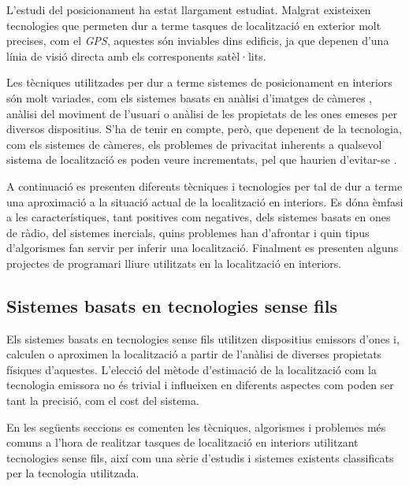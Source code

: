 
L’estudi del posicionament ha estat llargament estudiat. Malgrat existeixen tecnologies que permeten dur a terme tasques de localització en exterior molt precises, com el \textit{GPS}, aquestes són inviables dins edificis, ja que depenen d’una línia de visió directa amb els corresponents satèl·lits.

Les tècniques utilitzades per dur a terme sistemes de posicionament en interiors són molt variades, com els  sistemes basats en anàlisi d’imatges de càmeres \cite{martinez} \cite{mulloni}, anàlisi del moviment de l’usuari o anàlisi de les propietats de les ones emeses per diversos dispositius. S’ha de tenir en compte, però, que depenent de la tecnologia, com els sistemes de càmeres, els problemes de privacitat inherents a qualsevol sistema de localització es poden veure incrementats, pel que haurien d’evitar-se \cite{garcia}.

A continuació es presenten diferents tècniques i tecnologies per tal de dur a terme una aproximació a la situació actual de la localització en interiors. Es dóna èmfasi a les característiques, tant positives com negatives, dels sistemes basats en ones de ràdio, del sistemes inercials, quins problemes han d’afrontar i quin tipus d’algorismes fan servir per inferir una localització. Finalment es presenten alguns projectes de programari lliure utilitzats en la localització en interiors.

\subsection{Sistemes basats en tecnologies sense fils}

Els sistemes basats en tecnologies sense fils utilitzen dispositius emissors d'ones i, calculen o aproximen la localització a partir de l'anàlisi de diverses propietats físiques d'aquestes. L'elecció del mètode d'estimació de la localització com la tecnologia emissora no és trivial i influeixen en diferents aspectes com poden ser tant la precisió, com el cost del sistema.

En les següents seccions es comenten les tècniques, algorismes i problemes més comuns a l'hora de realitzar tasques de localització en interiors utilitzant tecnologies sense fils, així com una sèrie d'estudis i sistemes existents classificats per la tecnologia utilitzada. 

